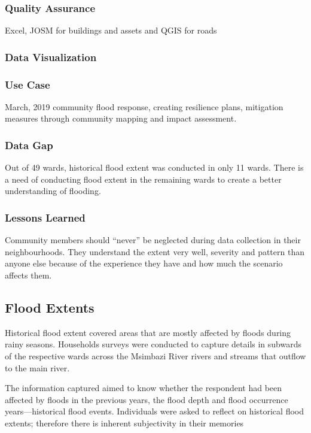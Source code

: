\documentclass[a4paper,12pt,twoside]{article}
\begin{document}
\subsubsection{Quality Assurance}
Excel, JOSM for buildings and assets and QGIS for roads

\subsubsection{Data Visualization}

\subsubsection{Use Case}
March, 2019 community flood response, creating resilience plans, mitigation measures through community mapping and impact assessment.

\subsubsection{Data Gap}
Out of 49 wards, historical flood extent was conducted in only 11 wards. There is a need of conducting flood extent in the remaining wards to create a better understanding of flooding.

\subsubsection{Lessons Learned}
Community members should “never” be neglected during data collection in their neighbourhoods. They understand the extent very well, severity and pattern than anyone else because of the experience they have and how much the scenario affects them.

\newpage
\subsection{Flood Extents}

Historical flood extent covered areas that are mostly affected by floods during rainy seasons. Households surveys were conducted to capture details in  subwards of the respective wards across the Msimbazi River rivers and streams that outflow to the main river.

\medskip

The information captured aimed to know whether the respondent had been affected by floods in the previous years, the flood depth and flood occurrence years---historical flood events. Individuals were asked to reflect on historical flood extents; therefore there is inherent subjectivity in their memories
\end{document}
